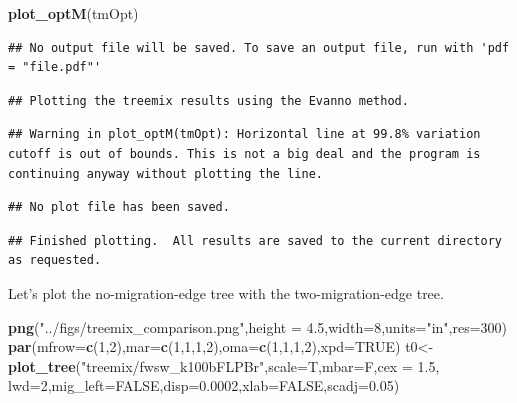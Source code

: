 \documentclass[]{article}
\newenvironment{Shaded}{\begin{snugshade}}{\end{snugshade}}
\newcommand{\KeywordTok}[1]{\textcolor[rgb]{0.13,0.29,0.53}{\textbf{#1}}}
\newcommand{\DataTypeTok}[1]{\textcolor[rgb]{0.13,0.29,0.53}{#1}}
\newcommand{\DecValTok}[1]{\textcolor[rgb]{0.00,0.00,0.81}{#1}}
\newcommand{\FloatTok}[1]{\textcolor[rgb]{0.00,0.00,0.81}{#1}}
\newcommand{\StringTok}[1]{\textcolor[rgb]{0.31,0.60,0.02}{#1}}
\newcommand{\OtherTok}[1]{\textcolor[rgb]{0.56,0.35,0.01}{#1}}
\newcommand{\NormalTok}[1]{#1}
\begin{document}
\begin{Shaded}
\begin{Highlighting}[]
\KeywordTok{plot_optM}\NormalTok{(tmOpt)}
\end{Highlighting}
\end{Shaded}

\begin{verbatim}
## No output file will be saved. To save an output file, run with 'pdf = "file.pdf"'
\end{verbatim}

\begin{verbatim}
## Plotting the treemix results using the Evanno method.
\end{verbatim}

\begin{verbatim}
## Warning in plot_optM(tmOpt): Horizontal line at 99.8% variation cutoff is out of bounds. This is not a big deal and the program is continuing anyway without plotting the line.
\end{verbatim}

\begin{verbatim}
## No plot file has been saved.
\end{verbatim}

\begin{verbatim}
## Finished plotting.  All results are saved to the current directory as requested.
\end{verbatim}

Let's plot the no-migration-edge tree with the two-migration-edge tree.

\begin{Shaded}
\begin{Highlighting}[]
\KeywordTok{png}\NormalTok{(}\StringTok{"../figs/treemix_comparison.png"}\NormalTok{,}\DataTypeTok{height =} \FloatTok{4.5}\NormalTok{,}\DataTypeTok{width=}\DecValTok{8}\NormalTok{,}\DataTypeTok{units=}\StringTok{"in"}\NormalTok{,}\DataTypeTok{res=}\DecValTok{300}\NormalTok{)}
\KeywordTok{par}\NormalTok{(}\DataTypeTok{mfrow=}\KeywordTok{c}\NormalTok{(}\DecValTok{1}\NormalTok{,}\DecValTok{2}\NormalTok{),}\DataTypeTok{mar=}\KeywordTok{c}\NormalTok{(}\DecValTok{1}\NormalTok{,}\DecValTok{1}\NormalTok{,}\DecValTok{1}\NormalTok{,}\DecValTok{2}\NormalTok{),}\DataTypeTok{oma=}\KeywordTok{c}\NormalTok{(}\DecValTok{1}\NormalTok{,}\DecValTok{1}\NormalTok{,}\DecValTok{1}\NormalTok{,}\DecValTok{2}\NormalTok{),}\DataTypeTok{xpd=}\OtherTok{TRUE}\NormalTok{)}
\NormalTok{t0<-}\KeywordTok{plot_tree}\NormalTok{(}\StringTok{"treemix/fwsw_k100bFLPBr"}\NormalTok{,}\DataTypeTok{scale=}\NormalTok{T,}\DataTypeTok{mbar=}\NormalTok{F,}\DataTypeTok{cex =} \FloatTok{1.5}\NormalTok{,}
              \DataTypeTok{lwd=}\DecValTok{2}\NormalTok{,}\DataTypeTok{mig_left=}\OtherTok{FALSE}\NormalTok{,}\DataTypeTok{disp=}\FloatTok{0.0002}\NormalTok{,}\DataTypeTok{xlab=}\OtherTok{FALSE}\NormalTok{,}\DataTypeTok{scadj=}\FloatTok{0.05}\NormalTok{)}
\end{Highlighting}
\end{Shaded}
\end{document}
